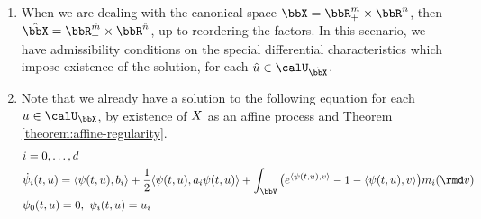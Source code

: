 \begin{remark}
  \begin{enumerate}
    \item
      When we are dealing with the canonical space $\stateSpace = \bbR^m_+ \times \bbR^n$, then $\hat\stateSpace = \bbR^{\hat m}_+ \times \bbR^{\hat n}$, up to reordering the factors.
      In this scenario, we have admissibility conditions on the special differential characteristics which impose existence of the solution, for each $\hat\momentVar \in \boundedSpaceJoint$.
    \item
      Note that we already have a solution to the following equation for each $\momentVar \in \boundedSpace$, by existence of $X$ as an affine process and Theorem \ref{theorem:affine-regularity}.
      \begin{equation*}
        \begin{aligned}[t]
          &i = 0, \ldots, d \\
          & \dot\affPart_i(t, \momentVar) = \prj{\affPart(t, \momentVar)}{\affDriftPart_i} + \frac12\prj{\affPart(t, \momentVar)}{\affDiffPart_i\affPart(t,\momentVar)} + \int_\vecSpace \big( e^\prj{\affPart(t,\momentVar)}{\markVar} - 1 - \prj{\affPart(t,\momentVar)}{\markVar} \big) \affJumpPart_i(\rmd\markVar) \\
          & \affPart_0(t, \momentVar) = 0, ~ \affPart_i(t, \momentVar) = \momentVar_i
        \end{aligned}
      \end{equation*}
  \end{enumerate}
\end{remark}



